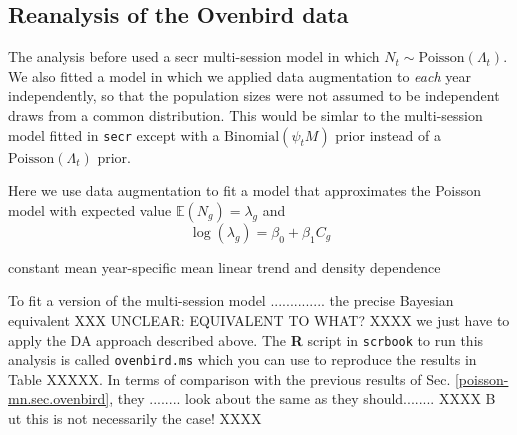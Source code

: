 \subsection{Reanalysis of the Ovenbird data}

The analysis before used a secr multi-session model in which $N_{t}
\sim \mbox{Poisson}(\Lambda_{t})$. We also fitted a model in which we
applied data augmentation to {\it each} year independently, so that
the population sizes were not assumed to be independent draws from a
common distribution.
This would be simlar to the multi-session
model fitted in \mbox{\tt secr} except with a
$\mbox{Binomial}(\psi_{t}M)$ prior instead of a
$\mbox{Poisson}(\Lambda_{t})$ prior.

Here we use data augmentation to fit a model that approximates the
Poisson model with expected value
$\mathbb{E}(N_{g}) = \lambda_{g}$
and 
\[
\log( \lambda_{g} ) = \beta_{0} + \beta_{1} C_{g}
\]

constant mean
year-specific mean
linear trend
and density dependence 


To fit a version of the multi-session model ..............
the precise Bayesian equivalent XXX UNCLEAR: EQUIVALENT TO
WHAT? XXXX we just have to apply the DA approach described above. The
{\bf R} script in \mbox{\tt scrbook} to run this analysis is called
\mbox{\tt ovenbird.ms} which you can use to reproduce the results
in Table XXXXX.  In terms of comparison with the previous results of
Sec. \ref{poisson-mn.sec.ovenbird}, they ........  look about the same
as they should........   XXXX B ut this is not necessarily the case! XXXX


